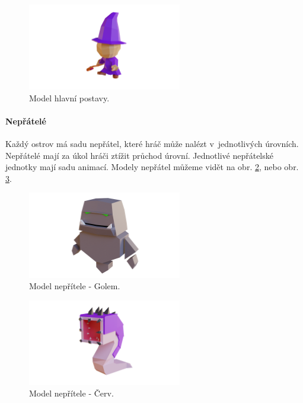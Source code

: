 \begin{figure}[h]
    \centering
    \includegraphics[width=0.6\textwidth]{img/hlavni-postava.png}
    \caption{Model hlavní postavy.}
    \label{fig:hlavni-postava}
\end{figure}

\paragraph{Nepřátelé}
Každý ostrov má sadu nepřátel, které hráč může nalézt v~jednotlivých úrovních. Nepřátelé mají za úkol hráči ztížit průchod úrovní. Jednotlivé nepřátelské jednotky mají sadu animací. Modely nepřátel můžeme vidět na obr. \ref{fig:nepritel-golem}, nebo obr. \ref{fig:nepritel-cerv}.

\begin{figure}[h]
    \centering
    \includegraphics[width=0.6\textwidth]{img/nepritel-golem.png}
    \caption{Model nepřítele - Golem.}
    \label{fig:nepritel-golem}
\end{figure}

\begin{figure}[h]
    \centering
    \includegraphics[width=0.6\textwidth]{img/nepritel-cerv.png}
    \caption{Model nepřítele - Červ.}
    \label{fig:nepritel-cerv}
\end{figure}

